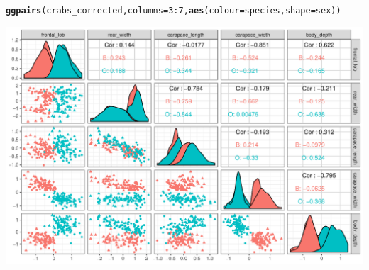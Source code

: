 \documentclass{beamer}\usepackage[]{graphicx}\usepackage[]{color}
\makeatletter
\newcommand{\hlnum}[1]{\textcolor[rgb]{0.686,0.059,0.569}{#1}}%
\newcommand{\hlopt}[1]{\textcolor[rgb]{0,0,0}{#1}}%
\newcommand{\hlstd}[1]{\textcolor[rgb]{0.345,0.345,0.345}{#1}}%
\newcommand{\hlkwc}[1]{\textcolor[rgb]{0.333,0.667,0.333}{#1}}%
\newcommand{\hlkwd}[1]{\textcolor[rgb]{0.737,0.353,0.396}{\textbf{#1}}}%
\newenvironment{kframe}{%
 \def\at@end@of@kframe{}%
 \ifinner\ifhmode%
  \def\at@end@of@kframe{\end{minipage}}%
  \begin{minipage}{\columnwidth}%
 \fi\fi%
 \def\FrameCommand##1{\hskip\@totalleftmargin \hskip-\fboxsep
 \colorbox{shadecolor}{##1}\hskip-\fboxsep
     \hskip-\linewidth \hskip-\@totalleftmargin \hskip\columnwidth}%
 \MakeFramed {\advance\hsize-\width
   \@totalleftmargin\z@ \linewidth\hsize
   \@setminipage}}%
 {\par\unskip\endMakeFramed%
 \at@end@of@kframe}
\newenvironment{knitrout}{}{} %
\makeatother
\begin{document}
\begin{frame}
\begin{knitrout}\scriptsize
{}\color{fgcolor}\begin{kframe}
\begin{alltt}
\hlkwd{ggpairs}\hlstd{(crabs_corrected,} \hlkwc{columns} \hlstd{=} \hlnum{3}\hlopt{:}\hlnum{7}\hlstd{,} \hlkwd{aes}\hlstd{(}\hlkwc{colour} \hlstd{= species,} \hlkwc{shape} \hlstd{= sex))}
\end{alltt}
\end{kframe}
\includegraphics[width=.8\textwidth]{figures/pairs_plot_corrected-1} 

\end{knitrout}

\end{frame}
\end{document}
